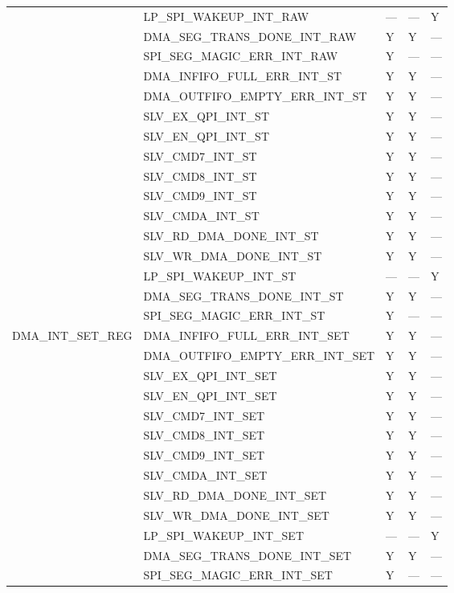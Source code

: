 \documentclass[main\_\_EN.tex]{subfiles}
\begin{document}
\begin{longtable}{|p{4.0cm}|p{6.5cm}|p{1.5cm}|p{1.5cm}|p{1.5cm}|}
& LP\_SPI\_WAKEUP\_INT\_RAW & --- & --- & Y \\ \cline{2-5}
& DMA\_SEG\_TRANS\_DONE\_INT\_RAW & Y & Y & --- \\ \cline{2-5}
& SPI\_SEG\_MAGIC\_ERR\_INT\_RAW & Y & --- & --- \\ \hline
\clearpage
\multirow{13}{*}{DMA\_INT\_ST\_REG} & DMA\_INFIFO\_FULL\_ERR\_INT\_ST & Y & Y & --- \\ \cline{2-5}
& DMA\_OUTFIFO\_EMPTY\_ERR\_INT\_ST & Y & Y & --- \\ \cline{2-5}
& SLV\_EX\_QPI\_INT\_ST & Y & Y & --- \\ \cline{2-5}
& SLV\_EN\_QPI\_INT\_ST & Y & Y & --- \\ \cline{2-5}
& SLV\_CMD7\_INT\_ST & Y & Y & --- \\ \cline{2-5}
& SLV\_CMD8\_INT\_ST & Y & Y & --- \\ \cline{2-5}
& SLV\_CMD9\_INT\_ST & Y & Y & --- \\ \cline{2-5}
& SLV\_CMDA\_INT\_ST & Y & Y & --- \\ \cline{2-5}
& SLV\_RD\_DMA\_DONE\_INT\_ST & Y & Y & --- \\ \cline{2-5}
& SLV\_WR\_DMA\_DONE\_INT\_ST & Y & Y & --- \\ \cline{2-5}
& LP\_SPI\_WAKEUP\_INT\_ST & --- & --- & Y \\ \cline{2-5}
& DMA\_SEG\_TRANS\_DONE\_INT\_ST & Y & Y & --- \\ \cline{2-5}
& SPI\_SEG\_MAGIC\_ERR\_INT\_ST & Y & --- & --- \\ \hline
\multirow{13}{*}{DMA\_INT\_SET\_REG} & DMA\_INFIFO\_FULL\_ERR\_INT\_SET & Y & Y & --- \\ \cline{2-5}
& DMA\_OUTFIFO\_EMPTY\_ERR\_INT\_SET & Y & Y & --- \\ \cline{2-5}
& SLV\_EX\_QPI\_INT\_SET & Y & Y & --- \\ \cline{2-5}
& SLV\_EN\_QPI\_INT\_SET & Y & Y & --- \\ \cline{2-5}
& SLV\_CMD7\_INT\_SET & Y & Y & --- \\ \cline{2-5}
& SLV\_CMD8\_INT\_SET & Y & Y & --- \\ \cline{2-5}
& SLV\_CMD9\_INT\_SET & Y & Y & --- \\ \cline{2-5}
& SLV\_CMDA\_INT\_SET & Y & Y & --- \\ \cline{2-5}
& SLV\_RD\_DMA\_DONE\_INT\_SET & Y & Y & --- \\ \cline{2-5}
& SLV\_WR\_DMA\_DONE\_INT\_SET & Y & Y & --- \\ \cline{2-5}
& LP\_SPI\_WAKEUP\_INT\_SET & --- & --- & Y \\ \cline{2-5}
& DMA\_SEG\_TRANS\_DONE\_INT\_SET & Y & Y & --- \\ \cline{2-5}
& SPI\_SEG\_MAGIC\_ERR\_INT\_SET & Y & --- & --- \\ \hline
\end{longtable}
\end{document}
